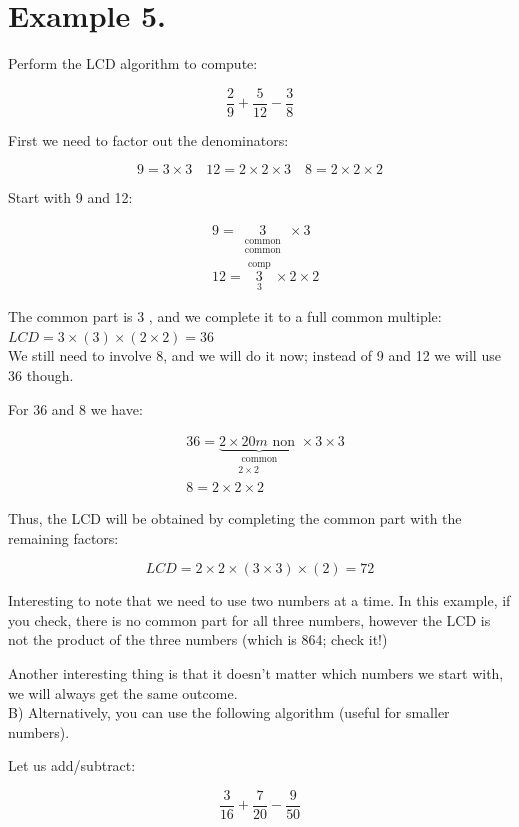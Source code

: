 \documentclass{ximera}
\begin{document}
\section*{Example 5.}
Perform the LCD algorithm to compute:

$$\frac{2}{9}+\frac{5}{12}-\frac{3}{8}$$

First we need to factor out the denominators:

$$9=3 \times 3 \quad 12=2 \times 2 \times 3 \quad 8=2 \times 2 \times 2$$

Start with 9 and 12:

$$\begin{aligned}
& 9=\underset{\substack{\text { common } \\
\text { common }}}{3} \times 3 \\
& 12=\underset{3}{\stackrel{\text { comp }}{3}} \times 2 \times 2
\end{aligned}$$

The common part is 3 , and we complete it to a full common multiple:\\
$L C D=3 \times(3) \times(2 \times 2)=36$\\
We still need to involve 8, and we will do it now; instead of 9 and 12 we will use 36 though.

For 36 and 8 we have:

$$\begin{aligned}
& 36=\underbrace{2 \times 20 m \text { non }}_{\substack{\text { common } \\
2 \times 2}} \times 3 \times 3 \\
& 8=2 \times 2 \times 2
\end{aligned}$$

Thus, the LCD will be obtained by completing the common part with the remaining factors:

$$L C D=2 \times 2 \times(3 \times 3) \times(2)=72$$

Interesting to note that we need to use two numbers at a time. In this example, if you check, there is no common part for all three numbers, however the LCD is not the product of the three numbers (which is 864; check it!)

Another interesting thing is that it doesn't matter which numbers we start with, we will always get the same outcome.\\
B) Alternatively, you can use the following algorithm (useful for smaller numbers).

Let us add/subtract:

$$\frac{3}{16}+\frac{7}{20}-\frac{9}{50}$$
\end{document}
